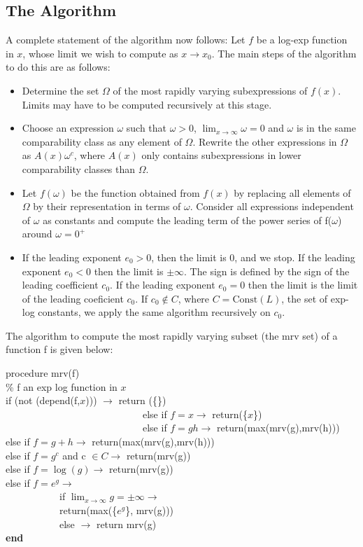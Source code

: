 \subsection{The Algorithm}
A complete statement of the algorithm now follows:
Let $f$ be a log-exp function in $x$, whose limit we wish to compute as $x\rightarrow x_0.$ The main steps of the algorithm to do this are as follows:
\begin{itemize}
\item{Determine the set $\Omega$ of the most rapidly varying subexpressions of $f(x)$. Limits may have to be computed recursively at this stage.}
\item{Choose an expression $\omega$ such that $\omega>0$, $\lim_{x \rightarrow \infty} \omega=0 $ and $\omega$ is in the same comparability class as any element of $\Omega$. Rewrite the other expressions in $\Omega$ as $A(x)\omega^{c}$, where $A(x)$ only contains subexpressions in lower comparability classes than $\Omega$.}
\item{Let $f(\omega)$ be the function obtained from $f(x)$ by replacing all elements of $\Omega $ by their representation in terms of $\omega$. Consider all expressions independent of $\omega$ as constants and compute the leading term of the power series of f($\omega$) around $\omega=0^{+}$ }
\item{If the leading exponent $e_0>0$, then the limit is 0, and we stop. If the leading exponent $e_0<0$ then the limit is $\pm \infty$. The sign is defined by the sign of the leading coefficient $c_0$. If the leading exponent $e_0=0$ then the limit is the limit of the leading coeficient $c_0$. If $c_0\not \in C$, where $C=\text{Const}(L)$, the set of exp-log constants, we apply the same algorithm recursively on $c_0$.}
\end{itemize}
The algorithm to compute the most rapidly varying subset (the mrv set) of a function f is given below:

\begin{flushleft}
procedure mrv(f) \\
\% f an exp log function in $x$ \\
if (not (depend(f,$x$))) $\rightarrow$ return (\{\}) \\
~~~~~~~~~~~~~~~~~~~~~~~~~~~~else if $f=x \rightarrow$ return(\{$x$\}) \\
~~~~~~~~~~~~~~~~~~~~~~~~~~~~else if $f=gh \rightarrow$ return(max(mrv(g),mrv(h))) \\
else if $f=g+h \rightarrow$ return(max(mrv(g),mrv(h))) \\
else if $f=g^{c}$ and c $\in C \rightarrow$ return(mrv(g)) \\
else if $f=\log(g) \rightarrow$ return(mrv(g)) \\
else if $f=e^{g} \rightarrow$ \\
~~~~~~~~~~~if $\lim_{x \rightarrow \infty} g=\pm\infty \rightarrow$ \\
~~~~~~~~~~~return(max(\{$e^{g}$\}, mrv(g))) \\
~~~~~~~~~~~else $\rightarrow$ return mrv(g) \\
\textbf{end}
\end{flushleft}

